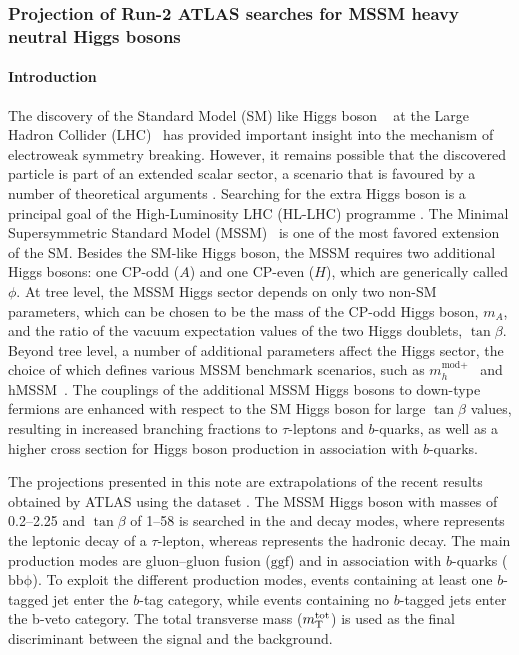 \subsubsection{Projection of Run-2 ATLAS searches for MSSM heavy neutral Higgs bosons}
\paragraph{Introduction}
\label{sec:intro}

The discovery of the Standard Model (SM) like Higgs boson ~\cite{ATLASHiggsJuly2012, CMSHiggsJuly2012}
at the Large Hadron Collider (LHC)~\cite{LHC} has provided important insight into the mechanism of 
electroweak symmetry breaking. However, it remains possible that the discovered particle is part 
of an extended scalar sector, a scenario that is favoured by a number of theoretical arguments 
\cite{Djouadi:2005gj,Branco:2011iw}. Searching for the extra Higgs boson is a principal goal of 
the High-Luminosity LHC (HL-LHC) programme \cite{ecfa15}. The Minimal Supersymmetric Standard 
Model (MSSM)~\cite{Djouadi:2005gj,Fayet:1976et,Fayet:1977yc} is one of the most favored extension 
of the SM. Besides the SM-like Higgs boson, the MSSM requires two additional Higgs bosons: 
one CP-odd ($A$) and one CP-even ($H$), which are generically called $\phi$. 
At tree level, the MSSM Higgs sector depends on only two non-SM parameters, which can be chosen 
to be the mass of the CP-odd Higgs boson, $m_A$, and the ratio of the vacuum expectation values 
of the two Higgs doublets, $\tan\beta$. Beyond tree level, a number of additional parameters 
affect the Higgs sector, the choice of which defines various MSSM benchmark scenarios, such as 
$m_{h}^{\text{mod}+}$~\cite{MSSMBenchmarks} and hMSSM~\cite{Djouadi:2013uqa,Bagnaschi:2015hka}.  
The couplings of the additional MSSM Higgs bosons to down-type fermions are enhanced with respect to 
the SM Higgs boson for large $\tan\beta$ values, resulting in increased branching fractions to 
$\tau$-leptons and $b$-quarks, as well as a higher cross section for Higgs boson production
in association with $b$-quarks.

The projections presented in this note are extrapolations of the recent results obtained by ATLAS
using the \RunTwo dataset \cite{ATLASRun2Ditau}.  The MSSM Higgs boson with masses of 
0.2--\SI{2.25}{\UTeV} and $\tan\beta$ of 1--58 is searched in the \lephad and \hadhad decay modes, 
where \taulep represents the leptonic decay of a $\tau$-lepton, whereas \tauhad represents 
the hadronic decay. The main production modes are gluon--gluon fusion ($\mathrm{ggf}$) and in association 
with $b$-quarks ($\mathrm{bb\phi}$).  
To exploit the different production modes, events containing at least one $b$-tagged jet enter 
the $b$-tag category, while events containing no $b$-tagged jets enter the b-veto category.
The total transverse mass ($m_\textnormal{T}^\textnormal{tot}$) is used as the final discriminant between the signal and the background. 

